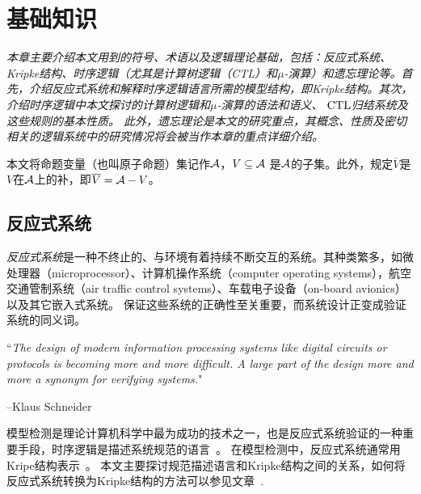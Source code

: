 \chapter{基础知识}\label{chapter02}

{\em 本章主要介绍本文用到的符号、术语以及逻辑理论基础，包括：反应式系统、Kripke结构、时序逻辑（尤其是计算树逻辑（CTL）和$\mu$-演算）和遗忘理论等。首先，介绍反应式系统和解释时序逻辑语言所需的模型结构，即Kripke结构。其次，介绍时序逻辑中本文探讨的计算树逻辑和$\mu$-演算的语法和语义、
	$\textrm{CTL}$归结系统及这些规则的基本性质。
	此外，遗忘理论是本文的研究重点，其概念、性质及密切相关的逻辑系统中的研究情况将会被当作本章的重点详细介绍。

本文将命题变量（也叫原子命题）集记作$\cal A$，$V\subseteq {\cal A}$ 是$\cal A$的子集。此外，规定$\overline{V}$是$V$在${\cal A}$上的补，即$\overline{V}={\cal A}-V$。}

\section{反应式系统}
{\em 反应式系统}是一种不终止的、与环境有着持续不断交互的系统。其种类繁多，如微处理器（microprocessor）、计算机操作系统（computer operating systems），航空交通管制系统（air traffic control systems）、车载电子设备（on-board avionics）以及其它嵌入式系统。
保证这些系统的正确性至关重要，而系统设计正变成验证系统的同义词。

``{\em The design of modern information processing systems like digital circuits or 
	protocols is becoming more and more difficult. A large part of the design 
	more and more a synonym for verifying systems.}"  

\hfill   --Klaus Schneider

模型检测是理论计算机科学中最为成功的技术之一，也是反应式系统验证的一种重要手段，时序逻辑是描述系统规范的语言~\cite{DBLP:books/sp/trends86/Pnueli86}。
在模型检测中，反应式系统通常用Kripe结构表示~\cite{DBLP:journals/fcsc/ZhuWXX10,DBLP:series/txtcs/Schneider04}。
本文主要探讨规范描述语言和Kripke结构之间的关系，如何将反应式系统转换为Kripke结构的方法可以参见文章~\cite{schneider2000verified,DBLP:conf/acsd/Schneider01,DBLP:conf/tphol/Schneider02}.

